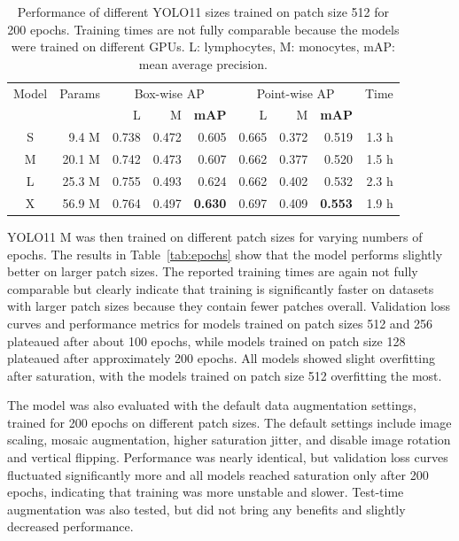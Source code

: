 \begin{table}[h]
    \centering
    \begin{tabular}{cr|rrrrrrr}
        \toprule
        Model & Params & \multicolumn{3}{c}{Box-wise AP} & \multicolumn{3}{c}{Point-wise AP} & Time \\
        & & L & M & \textbf{mAP} & L & M & \textbf{mAP} & \\
        \midrule
        S & 9.4 M & 0.738 & 0.472 & 0.605 & 0.665 & 0.372 & 0.519 & 1.3 h \\
        M & 20.1 M & 0.742 & 0.473 & 0.607 & 0.662 & 0.377 & 0.520 & 1.5 h \\
        L & 25.3 M & 0.755 & 0.493 & 0.624 & 0.662 & 0.402 & 0.532 & 2.3 h \\
        X & 56.9 M & 0.764 & 0.497 & \textbf{0.630} & 0.697 & 0.409 & \textbf{0.553} & 1.9 h \\
        \bottomrule
    \end{tabular}
    \caption{Performance of different YOLO11 sizes trained on patch size 512 for 200 epochs. Training times are not fully comparable because the models were trained on different GPUs. L: lymphocytes, M: monocytes, mAP: mean average precision.}
    \label{tab:yolo_size}
\end{table}

YOLO11 M was then trained on different patch sizes for varying numbers of epochs. The results in Table~\ref{tab:epochs} show that the model performs slightly better on larger patch sizes. The reported training times are again not fully comparable but clearly indicate that training is significantly faster on datasets with larger patch sizes because they contain fewer patches overall. Validation loss curves and performance metrics for models trained on patch sizes 512 and 256 plateaued after about 100 epochs, while models trained on patch size 128 plateaued after approximately 200 epochs. All models showed slight overfitting after saturation, with the models trained on patch size 512 overfitting the most.

The model was also evaluated with the default data augmentation settings, trained for 200 epochs on different patch sizes. The default settings include image scaling, mosaic augmentation, higher saturation jitter, and disable image rotation and vertical flipping. Performance was nearly identical, but validation loss curves fluctuated significantly more and all models reached saturation only after 200 epochs, indicating that training was more unstable and slower. Test-time augmentation was also tested, but did not bring any benefits and slightly decreased performance.

